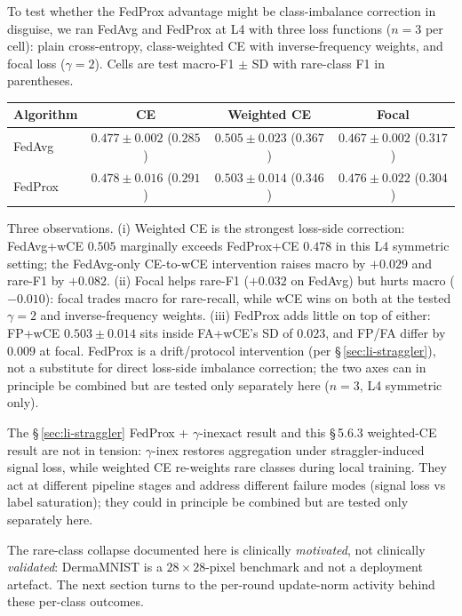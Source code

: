 To test whether the FedProx advantage might be class-imbalance correction
in disguise, we ran FedAvg and FedProx at L4 with three loss functions
($n=3$ per cell): plain cross-entropy, class-weighted CE with
inverse-frequency weights, and focal loss ($\gamma = 2$). Cells are test
macro-F1 $\pm$ SD with rare-class F1 in parentheses.

\begin{center}
\begin{tabular}{lccc}
\hline
Algorithm & CE & Weighted CE & Focal \\
\hline
FedAvg  & $0.477 \pm 0.002$ ($0.285$) & $\mathbf{0.505 \pm 0.023}$ ($\mathbf{0.367}$) & $0.467 \pm 0.002$ ($0.317$) \\
FedProx & $0.478 \pm 0.016$ ($0.291$) & $0.503 \pm 0.014$ ($0.346$)                   & $0.476 \pm 0.022$ ($0.304$) \\
\hline
\end{tabular}
\end{center}

Three observations. (i) Weighted CE is the strongest loss-side correction:
FedAvg+wCE $0.505$ marginally exceeds FedProx+CE $0.478$ in this L4
symmetric setting; the FedAvg-only CE-to-wCE intervention raises macro by
$+0.029$ and rare-F1 by $+0.082$. (ii) Focal helps rare-F1 ($+0.032$ on
FedAvg) but hurts macro ($-0.010$): focal trades macro for rare-recall,
while wCE wins on both at the tested $\gamma=2$ and inverse-frequency
weights. (iii) FedProx adds little on top of either: FP+wCE
$0.503 \pm 0.014$ sits inside FA+wCE's SD of $0.023$, and FP/FA differ by
$0.009$ at focal. FedProx is a drift/protocol intervention (per
\S\,\ref{sec:li-straggler}), not a substitute for direct loss-side
imbalance correction; the two axes can in principle be combined but are
tested only separately here ($n=3$, L4 symmetric only).

The \S\,\ref{sec:li-straggler} FedProx + $\gamma$-inexact result and this
\S\,5.6.3 weighted-CE result are not in tension: $\gamma$-inex restores
aggregation under straggler-induced signal loss, while weighted CE
re-weights rare classes during local training. They act at different
pipeline stages and address different failure modes (signal loss vs label
saturation); they could in principle be combined but are tested only
separately here.

The rare-class collapse documented here is clinically \emph{motivated},
not clinically \emph{validated}: DermaMNIST is a $28 \times 28$-pixel
benchmark and not a deployment artefact. The next section turns to the
per-round update-norm activity behind these per-class outcomes.


